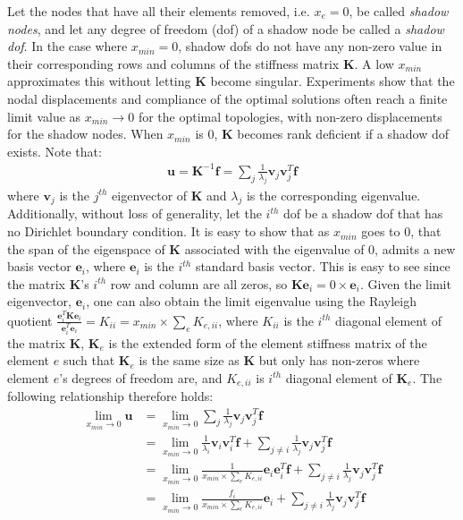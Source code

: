   Let the nodes that have all their elements removed, i.e. $x_e = 0$, be called \textit{shadow nodes}, and let any degree of freedom (dof) of a shadow node be called a \textit{shadow dof}. In the case where $x_{min} = 0$, shadow dofs do not have any non-zero value in their corresponding rows and columns of the stiffness matrix $\bm{K}$. A low $x_{min}$ approximates this without letting $\bm{K}$ become singular. Experiments show that the nodal displacements and compliance of the optimal solutions often reach a finite limit value as $x_{min} \to 0$ for the optimal topologies, with non-zero displacements for the shadow nodes. When $x_{min}$ is 0, $\bm{K}$ becomes rank deficient if a shadow dof exists. Note that: 
  \begin{align}
    \bm{u} = \bm{K}^{-1} \bm{f} = \sum_j \frac{1}{\lambda_j} \bm{v}_j \bm{v}_j^T \bm{f}
  \end{align}
  where $\bm{v}_j$ is the $j^{th}$ eigenvector of $\bm{K}$ and $\lambda_j$ is the corresponding eigenvalue. Additionally, without loss of generality, let the $i^{th}$ dof be a shadow dof that has no Dirichlet boundary condition. It is easy to show that as $x_{min}$ goes to 0, that the span of the eigenspace of $\bm{K}$ associated with the eigenvalue of 0, admits a new basis vector $\bm{e}_i$, where $\bm{e}_i$ is the $i^{th}$ standard basis vector. This is easy to see since the matrix $\bm{K}$'s $i^{th}$ row and column are all zeros, so $\bm{K} \bm{e}_i = 0 \times \bm{e}_i$. Given the limit eigenvector, $\bm{e}_i$, one can also obtain the limit eigenvalue using the Rayleigh quotient $\frac{\bm{e}^T_i \bm{K} \bm{e}_i}{\bm{e}^T_i \bm{e}_i} = K_{ii} = x_{min} \times \sum_e K_{e,ii}$, where $K_{ii}$ is the $i^{th}$ diagonal element of the matrix $\bm{K}$, $\bm{K}_e$ is the extended form of the element stiffness matrix of the element $e$ such that $\bm{K}_e$ is the same size as $\bm{K}$ but only has non-zeros where element $e$'s degrees of freedom are, and $K_{e,ii}$ is $i^{th}$ diagonal element of $\bm{K}_e$. The following relationship therefore holds:
  \begin{align}
    \lim_{x_{min} \to 0} \bm{u} & = \lim_{x_{min} \to 0} \sum_j \frac{1}{\lambda_j} \bm{v}_j \bm{v}_j^T \bm{f} \\ 
    & = \lim_{x_{min} \to 0} \frac{1}{\lambda_i} \bm{v}_i \bm{v}_i^T \bm{f} + \sum_{j \neq i} \frac{1}{\lambda_j} \bm{v}_j \bm{v}_j^T \bm{f} \\
    & = \lim_{x_{min} \to 0} \frac{1}{x_{min} \times \sum_e K_{e,ii}} \bm{e}_i \bm{e}_i^T \bm{f} + \sum_{j \neq i} \frac{1}{\lambda_j} \bm{v}_j \bm{v}_j^T \bm{f}\\
    & = \lim_{x_{min} \to 0} \frac{f_i}{x_{min} \times \sum_e K_{e,ii}} \bm{e}_i + \sum_{j \neq i} \frac{1}{\lambda_j} \bm{v}_j \bm{v}_j^T \bm{f}
  \end{align}
